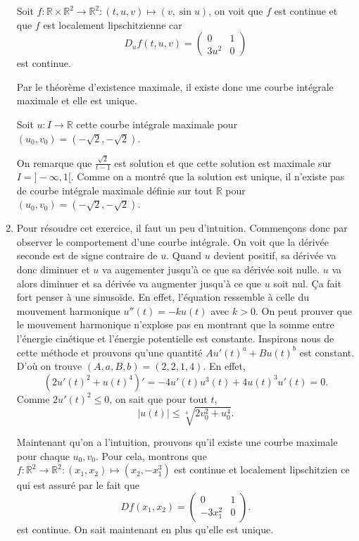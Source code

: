 \documentclass{article}
\begin{document}
\begin{enumerate}
    Soit $f:\mathbb{R}\times\mathbb{R}^2\to\mathbb{R}^2:
    (t,u,v)\mapsto(v,\sin u)$, on voit que $f$ est continue et que
    $f$ est localement lipschitzienne car
    \[ D_uf(t,u,v) =
      \begin{pmatrix}
        0 & 1\\
        3u^2 & 0
    \end{pmatrix} \]
    est continue.

    Par le théorème d'existence maximale, il existe donc une courbe intégrale
    maximale et elle est unique.

    Soit $u:I\to\mathbb{R}$ cette courbe intégrale maximale pour
    $(u_0,v_0) = (-\sqrt{2},-\sqrt{2})$.

    On remarque que $\frac{\sqrt{2}}{t-1}$ est solution et que cette solution
    est maximale sur $I = ]-\infty,1[$.
    Comme on a montré que la solution est unique,
    il n'existe pas de courbe intégrale maximale définie sur tout $\mathbb{R}$
    pour $(u_0,v_0) = (-\sqrt{2},-\sqrt{2})$.
  \item
    Pour résoudre cet exercice, il faut un peu d'intuition.
    Commençons donc par observer le comportement d'une courbe intégrale.
    On voit que la dérivée seconde est de signe contraire de $u$.
    Quand $u$ devient positif, sa dérivée va donc diminuer et $u$ va
    augementer jusqu'à ce que sa dérivée soit nulle.
    $u$ va alors diminuer et sa dérivée va augmenter jusqu'à ce que $u$ soit
    nul.
    Ça fait fort penser à une sinusoïde.
    En effet, l'équation ressemble à celle du mouvement harmonique
    $u''(t) = -ku(t)$ avec $k > 0$.
    On peut prouver que le mouvement harmonique n'explose pas en montrant
    que la somme entre l'énergie cinétique et l'énergie potentielle est
    constante.
    Inspirons nous de cette méthode et prouvons qu'une quantité
    $Au'(t)^a + Bu(t)^b$ est constant.
    D'où on trouve $(A,a,B,b) = (2,2,1,4)$.
    En effet,
    \[ (2u'(t)^2 + u(t)^4)' = -4u'(t)u^3(t) + 4u(t)^3u'(t) = 0. \]
    Comme $2u'(t)^2 \leq 0$, on sait que pour tout $t$,
    \[ |u(t)| \leq \sqrt[4]{2v_0^2 + u_0^4}. \]

    Maintenant qu'on a l'intuition, prouvons qu'il existe une courbe
    maximale pour chaque $u_0,v_0$.
    Pour cela, montrons que
    $f:\mathbb{R}^2 \to \mathbb{R}^2:(x_1,x_2) \mapsto (x_2,-x_1^3)$
    est continue et localement lipschitzien ce qui est assuré par le fait
    que
    \[ Df(x_1,x_2) =
      \begin{pmatrix}
        0 & 1\\
        -3x_1^2 & 0
      \end{pmatrix}.
    \]
    est continue.
    On sait maintenant en plus qu'elle est unique.


\end{enumerate}
\end{document}
